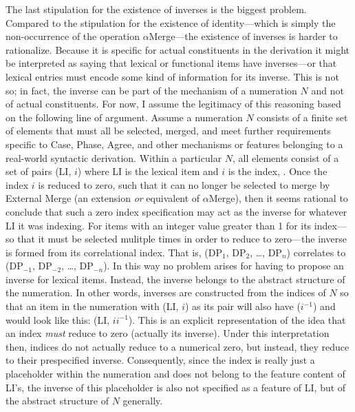 \documentclass[11pt,twoside]{article}
\begin{document}
The last stipulation for the existence of inverses is the biggest problem. Compared to the stipulation for the existence of identity---which is simply the non-occurrence of the operation $\alpha$Merge---the existence of inverses is harder to rationalize. Because it is specific for actual constituents in the derivation it might be interpreted as saying that lexical or functional items have inverses---or that lexical entries must encode some kind of information for its inverse. This is not so; in fact, the inverse can be part of the mechanism of a numeration $N$ and not of actual constituents. For now, I assume the legitimacy of this reasoning  based on the following line of argument. Assume a numeration $N$ consists of a finite set of elements that must all be selected, merged, and meet further requirements specific to Case, Phase, Agree, and other mechanisms or features belonging to a real-world syntactic derivation. Within a particular $N$, all elements consist of a set of pairs (LI, $i$) where LI is the lexical item and $i$ is the index, \cite{chomsky95mp}. Once the index $i$ is reduced to zero, such that it can no longer be selected to merge by External Merge (an extension \textsl{or} equivalent of $\alpha$Merge), then it seems rational to conclude that such a zero index specification may act as the inverse for whatever LI it was indexing. For items with an integer value greater than 1 for its index---so that it must be selected mulitple times in order to reduce to zero---the inverse is formed from its correlational index. That is, (DP$_{1}$, DP$_{2}$, \ldots, DP$_{n}$) correlates to (DP$_{-1}$, DP$_{-2}$, \ldots, DP$_{-n}$). In this way no problem arises for having to propose an inverse for lexical items. Instead, the inverse belongs to the abstract structure of the numeration. In other words, inverses are constructed from the indices of $N$ so that an item in the numeration with (LI, $i$) as its pair will also have ($i^{-1}$) and would look like this: (LI, $ii^{-1}$). This is an explicit representation of the idea that an index \textsl{must} reduce to zero (actually its inverse). Under this interpretation then, indices do not actually reduce to a numerical zero, but instead, they reduce to their prespecified inverse. Consequently, since the index is really just a placeholder within the numeration and does not belong to the feature content of LI's, the inverse of this placeholder is also not specified as a feature of LI, but of the abstract structure of $N$ generally.
\end{document}
